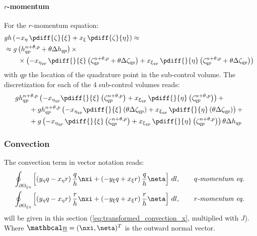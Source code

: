 \paragraph*{$r$-momentum}\label{sec:pressure_gradient_r}
For the $r$-momentum equation:
\begin{align}
    & g h \left( -x_{\eta}\, \pdiff{\zeta}{\xi} + x_{\xi}\, \pdiff{\zeta}{\eta} \right) \approx
    \\
    & \approx g \left( h^{n+\theta,p}_{qp} + \theta \Delta h_{qp}\right)  \times
    \\*
    & \qquad \times \left( -x_{\eta_{qp}}\, \pdiff{}{\xi}\left(\zeta^{n+\theta,p}_{qp} + \theta \Delta \zeta_{qp} \right)
    + x_{\xi_{qp}}\, \pdiff{}{\eta}\left(\zeta^{n+\theta,p}_{qp} + \theta \Delta \zeta_{qp}   \right)
    \right)
\end{align}
with $qp$ the location of the quadrature point in the sub-control volume.
The discretization for each of the 4 sub-control volumes reads:
%
\begin{align}
    &g h^{n+\theta,p}_{qp} \left( -x_{\eta_{qp}}\pdiff{}{\xi}\left( \zeta^{n+\theta,p}_{qp} \right)
    +x_{\xi_{qp}}\, \pdiff{}{\eta}\left(\zeta^{n+\theta,p}_{qp} \right) \right) +
    \\
    &\qquad + g h^{n+\theta,p}_{qp} \left( -x_{\eta_{qp}}\pdiff{}{\xi}\left(\theta\Delta \zeta_{qp}\right)
    + x_{\xi_{qp}}\, \pdiff{}{\eta} \left(\theta\Delta\zeta_{qp} \right)
    \right) +
    \\
    &\qquad + g
    \left(- x_{\eta_{qp}}\, \pdiff{}{\xi}\left(\zeta^{n+\theta,p}_{qp} \right)
    +x_{\xi_{qp}}\, \pdiff{}{\eta}\left(\zeta^{n+\theta,p}_{qp} \right)
    \right)\theta \Delta h_{qp}
\end{align}
\subsubsection{Convection}
The convection term in vector notation reads:
\begin{align}
    &\oint_{\partial\Omega_{\xi\eta}} \left[  \left( y_{\eta}q - x_{\eta} r \right) \frac{q}{h}  \nxi + \left( -y_{\xi}q  + x_{\xi}r\right) \frac{q}{h} \neta \right] \, dl,\qquad \textit{$q$-momentum eq.}
    \\
    &\oint_{\partial\Omega_{\xi\eta}} \left[  \left( y_{\eta}q - x_{\eta} r \right) \frac{r}{h}  \nxi + \left( -y_{\xi}q  + x_{\xi}r\right) \frac{r}{h} \neta \right] \, dl,\qquad \textit{$r$-momentum eq.}
\end{align}
will be given in this section (\autoref{eq:transformed_convection_x}, multiplied with $J$).
Where $\vecn = (\nxi, \neta)^T$ is the outward normal vector.

